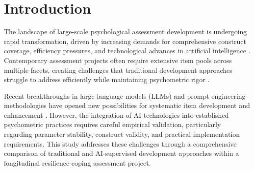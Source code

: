 \documentclass[12pt,a4paper]{article}
\begin{document}
\begin{abstract}
\textbf{Conclusions:} AI-supervised development with systematic prompt engineering represents a viable advancement for large-scale assessment projects, offering efficiency gains while preserving psychometric quality. The three-cycle iterative refinement approach proved essential for achieving optimal outcomes, with each cycle contributing distinct improvements in theoretical consistency, linguistic precision, and psychometric performance. Implementation requires careful consideration of technical requirements, expert oversight needs, and iterative refinement protocols. The approach shows particular promise for extensive item pools and resource-constrained projects, though broader generalizability across constructs and populations requires further investigation.

\textbf{Keywords:} AI-supervised development, prompt engineering, large language models, resilience assessment, iterative refinement, large-scale assessment

\end{abstract}

\newpage

\section{Introduction}

The landscape of large-scale psychological assessment development is undergoing rapid transformation, driven by increasing demands for comprehensive construct coverage, efficiency pressures, and technological advances in artificial intelligence \cite{VonDavier2017, Williamson2006}. Contemporary assessment projects often require extensive item pools across multiple facets, creating challenges that traditional development approaches struggle to address efficiently while maintaining psychometric rigor \cite{Embretson2013, VanderLinden2016}.

Recent breakthroughs in large language models (LLMs) and prompt engineering methodologies have opened new possibilities for systematic item development and enhancement \cite{Tong2024, Li2024}. However, the integration of AI technologies into established psychometric practices requires careful empirical validation, particularly regarding parameter stability, construct validity, and practical implementation requirements. This study addresses these challenges through a comprehensive comparison of traditional and AI-supervised development approaches within a longitudinal resilience-coping assessment project.
\end{document}

